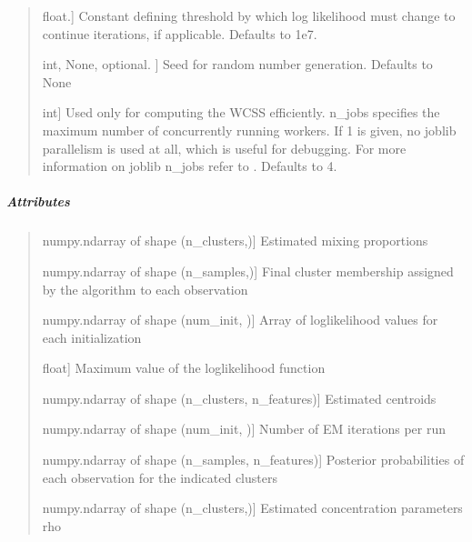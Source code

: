 \documentclass[letterpaper,10pt,english,openany,oneside]{sphinxmanual}
\begin{document}
\begin{fulllineitems}
\begin{quote}
\begin{description}
\sphinxlineitem{tol}{[}float.{]}
\sphinxAtStartPar
Constant defining threshold by which log 
likelihood must change to continue iterations, if applicable.
Defaults to 1e\sphinxhyphen{}7.

\sphinxlineitem{random\_state}{[}int, None, optional. {]}
\sphinxAtStartPar
Seed for random number generation. Defaults to None

\sphinxlineitem{n\_jobs}{[}int{]}
\sphinxAtStartPar
Used only for computing the WCSS efficiently.
n\_jobs specifies the maximum number of concurrently running workers. 
If 1 is given, no joblib parallelism is used at all, which is useful for debugging.
For more information on joblib n\_jobs refer to \sphinxhyphen{} 
.
Defaults to 4.

\end{description}
\end{quote}


\subparagraph{Attributes}
\label{\detokenize{api_reference/generated/QuadratiK.spherical_clustering.PKBC:attributes}}\begin{quote}
\begin{description}
\sphinxlineitem{alpha\_}{[}numpy.ndarray of shape (n\_clusters,){]}
\sphinxAtStartPar
Estimated mixing proportions

\sphinxlineitem{labels\_}{[}numpy.ndarray of shape (n\_samples,){]}
\sphinxAtStartPar
Final cluster membership assigned by the algorithm to each observation

\sphinxlineitem{log\_lik\_vec}{[}numpy.ndarray of shape (num\_init, ){]}
\sphinxAtStartPar
Array of log\sphinxhyphen{}likelihood values for each initialization

\sphinxlineitem{loklik\_}{[}float{]}
\sphinxAtStartPar
Maximum value of the log\sphinxhyphen{}likelihood function

\sphinxlineitem{mu\_}{[}numpy.ndarray of shape (n\_clusters, n\_features){]}
\sphinxAtStartPar
Estimated centroids

\sphinxlineitem{num\_iter\_per\_run}{[}numpy.ndarray of shape (num\_init, ){]}
\sphinxAtStartPar
Number of E\sphinxhyphen{}M iterations per run

\sphinxlineitem{post\_probs\_}{[}numpy.ndarray of shape (n\_samples, n\_features){]}
\sphinxAtStartPar
Posterior probabilities of each observation for the indicated clusters

\sphinxlineitem{rho\_}{[}numpy.ndarray of shape (n\_clusters,){]}
\sphinxAtStartPar
Estimated concentration parameters rho


\end{description}
\end{quote}
\end{fulllineitems}
\end{document}
